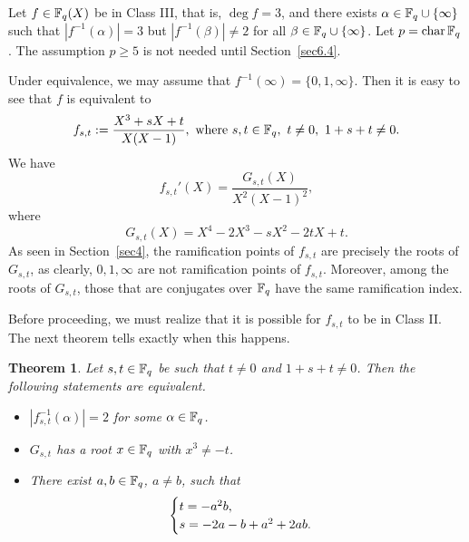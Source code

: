 \documentclass{amsart}
\newtheorem{thm}{Theorem}[section]
\numberwithin{equation}{section}
\theoremstyle{definition}
\newcommand{\f}{\Bbb F}
\newcommand{\ch}{\text{\rm char\,}}
\begin{document}
Let $f\in\f_q(X)$ be in Class III, that is, $\deg f=3$, and there exists $\alpha\in\f_q\cup\{\infty\}$ such that $|f^{-1}(\alpha)|=3$ but $|f^{-1}(\beta)|\ne 2$ for all $\beta\in\f_q\cup\{\infty\}$. Let $p=\ch\f_q$. The assumption $p\ge 5$ is not needed until Section~\ref{sec6.4}.

Under equivalence, we may assume that $f^{-1}(\infty)=\{0,1,\infty\}$. Then it is easy to see that $f$ is equivalent to
\begin{equation}\label{fst}
f_{s,t}:=\frac{X^3+sX+t}{X(X-1)},\ \text{where}\ s,t\in\f_q,\ t\ne 0,\ 1+s+t\ne0.
\end{equation}
We have
\[
f_{s,t}'(X)=\frac{G_{s,t}(X)}{X^2(X-1)^2},
\]
where
\begin{equation}\label{gst}
G_{s,t}(X)=X^4-2X^3-sX^2-2tX+t.
\end{equation}
As seen in Section~\ref{sec4}, the ramification points of $f_{s,t}$ are precisely the roots of $G_{s,t}$, as clearly, $0,1,\infty$ are not ramification points of $f_{s,t}$. Moreover, among the roots of $G_{s,t}$, those that are conjugates over $\f_q$ have the same ramification index.

Before proceeding, we must realize that it is possible for $f_{s,t}$ to be in Class II. The next theorem tells exactly when this happens.

\begin{thm}\label{Theorem 2}
Let $s,t\in\f_q$ be such that $t\ne 0$ and $1+s+t\ne 0$. Then the following statements are equivalent.
\begin{itemize}
\item[(i)] $|f_{s,t}^{-1}(\alpha)|=2$ for some $\alpha\in\f_q$.

\item[(ii)] $G_{s,t}$ has a root $x\in\f_q$ with $x^3\ne -t$.

\item[(iii)] There exist $a,b\in\f_q$, $a\ne b$, such that 
\[
\begin{cases}
t=-a^2b,\cr
s=-2a-b+a^2+2ab.
\end{cases}
\]
\end{itemize}
\end{thm}
\end{document}
